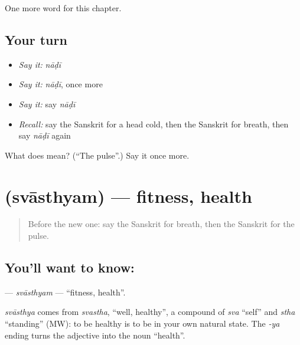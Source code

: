 \begin{grammarlens}[title={What you've built}]
One more word for this chapter.
\end{grammarlens}

\subsection*{Your turn}
\begin{itemize}
\raggedright
  \item \emph{Say it:} \emph{nāḍī}
  \item \emph{Say it:} \emph{nāḍī}, once more
  \item \emph{Say it:} say \emph{nāḍī}
  \item \emph{Recall:} say the Sanskrit for a head cold, then the Sanskrit for breath, then say \emph{nāḍī} again
\end{itemize}

\begin{tcolorbox}[breakable,colback=teal!4,colframe=teal!35!black,title={Before you move on}]
What does  mean? (\textquotedblleft{}The pulse\textquotedblright{}.) Say it once more.
\end{tcolorbox}
\section[\texorpdfstring{\sk{स्वास्थ्यम्} (svāsthyam)}{स्वास्थ्यम् (svāsthyam)}]{ (svāsthyam) — fitness, health}

\label{lesson:SA-C181-svasthyam}



\begin{quote}
Before the new one: say the Sanskrit for breath, then the Sanskrit for the pulse.
\end{quote}

\subsection*{You'll want to know: }
\textbf{} — \emph{svāsthyam} — \textquotedblleft{}fitness, health\textquotedblright{}.

\begin{cousinweb}
\emph{svāsthya} comes from \emph{svastha}, \textquotedblleft{}well, healthy\textquotedblright{}, a compound of \emph{sva} \textquotedblleft{}self\textquotedblright{} and \emph{stha} \textquotedblleft{}standing\textquotedblright{} (MW): to be healthy is to be in your own natural state. The \emph{-ya} ending turns the adjective into the noun \textquotedblleft{}health\textquotedblright{}.
\end{cousinweb}

